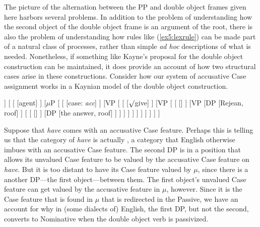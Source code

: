 The picture of the alternation between the PP and double object frames given here harbors several problems. In addition to the problem of understanding how the second object of the double object frame is an argument of the root,%
%
%
%
there is also the problem of understanding how rules like (\ref{ex5:lexrule}) can be made part of a natural class of processes, rather than simple \emph{ad hoc} descriptions of what is needed. Nonetheless, if something like Kayne's proposal for the double object construction can be maintained, it does provide an account of how two structural cases arise in these constructions. Consider how our system of accusative Case assignment works in a Kaynian model of the double object construction.
\begin{exe}
	\raggedright
	\ex \label{ex5:casekayne} 
	\small
	\begin{forest}
	[vP
		[DP [Veena, roof]]
		[ 
			[ ]
			[$\mu$P [\ibar{$\mu$}
				[\obar{$\mu$} [case: \emph{acc}] ]
				[VP [
					[ ]
					[VP [
						[ [] ]
						[VP
							[DP [Rejean, roof] ]
							[
								[ [] ]
								[DP [the answer, roof] ]
							 ]
						 ]
					] ]
				] ]
			] ]
		]
	]
	\end{forest}
\end{exe}
Suppose that \emph{have} comes with an accusative Case feature. Perhaps this is telling us that the category of \emph{have} is actually ,%
%
% 
%
a category that English otherwise imbues with an accusative Case feature. The second DP is in a position that allows its unvalued Case feature to be valued by the accusative Case feature on \emph{have}. But it is too distant to have its Case feature valued by $\mu$, since there is a another DP---the first object---between them. The first object's unvalued Case feature can get valued by the accusative feature in $\mu$, however. Since it is the Case feature that is found in $\mu$ that is redirected in the Passive, we have an account for why in (some dialects of) English, the first DP, but not the second, converts to Nominative when the double object verb is passivized.

